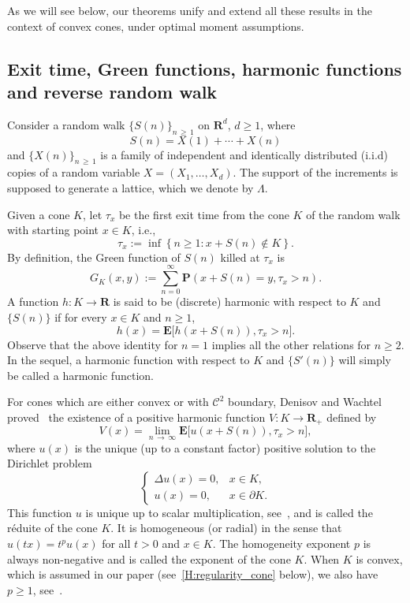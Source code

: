 \documentclass[AHL,Unicode,longabstracts,published]{cedram}
\newcommand{\clC}{\mathcal{C}}
\newcommand{\pr}{\mathbf{P}}
\newcommand{\e}{\mathbf{E}}
\newcommand{\bfR}{\mathbf{R}}
\renewcommand{\geq}{\geqslant}
\begin{document}
As we will see below, our theorems unify and extend all these results in the context of convex cones, under optimal moment assumptions.


\subsection*{Exit time, Green functions, harmonic functions and reverse random walk}
Consider a random walk $\{S(n)\}_{n\,\geq\,1}$ on $\bfR^d$, $d\geq1$, where
\[
S(n) = X(1)+\cdots +X(n)
\]
and $\{X(n)\}_{n\,\geq\,1}$ is a family of independent and identically distributed (i.i.d) copies of a random variable $X=(X_1,\ldots,X_d)$. The support of the increments is supposed to generate a lattice, which we denote by $\Lambda$.

Given a cone $K$, let $\tau_x$ be the first exit time from the cone $K$ of the random walk with starting point $x\in K$, i.e.,
\begin{equation}\label{eq:exit_time_def}
\tau_x:=\inf\left\{n\geq 1 : x+S(n)\notin K\right\}.
\end{equation}
By definition, the Green function of $S(n)$ killed at $\tau_x$ is
\begin{equation}\label{eq:Green_function_def}
G_K(x,y) := \sum_{n=0}^\infty \pr(x+S(n)=y,\tau_x>n).
\end{equation}
A function $h:{K}\to \bfR$ is said to be (discrete) harmonic with respect to ${K}$ and $\{S(n)\}$ if for every $x\in{K}$ and $n\geq 1$,
\[
h(x)=\e\big[h(x+S(n)),\tau_{x}>n\big].
\]
Observe that the above identity for $n=1$ implies all the other relations for $n\geq 2$. In the sequel, a harmonic function with respect to ${K}$ and $\{S'(n)\}$ will simply be called a harmonic function.

For cones which are either convex or with $\clC^{2}$ boundary, Denisov and Wachtel proved~\cite{DeWa-15,DeWa-19} the existence of a positive harmonic function $V:{K}\to \bfR_+$ defined by
\begin{equation}\label{definition_V(x)}
V(x)=\lim\limits_{n\,\rightarrow\,\infty}\e\big[u\left(x+S(n)\right)\!,\tau_{x}>n\big],
\end{equation}
where $u(x)$ is the unique (up to a constant factor) positive solution to the Dirichlet problem
\begin{equation}\label{eq:Dirichlet_problem}
\begin{cases}
\Delta u(x)=0,& x\in K,\\
u(x)=0,& x\in\partial K.
\end{cases}
\end{equation}
This function $u$ is unique up to scalar multiplication, see~\cite[Corollary~6.10 and Remark~6.11]{GySa-11}, and is called the réduite of the cone ${K}$. It is homogeneous (or radial) in the sense that $u(tx)=t^{p}u(x)$ for all $t>0$ and $x\in K$. The homogeneity exponent $p$ is always non-negative and is called the exponent of the cone ${K}$. When $K$ is convex, which is assumed in our paper (see~\eqref{H:regularity_cone} below), we also have $p\geq 1$, see~\cite{BaSm-97}.
\end{document}
